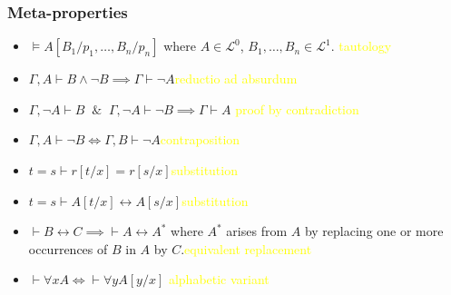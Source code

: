 \documentclass[UTF8,aspectratio=43,11pt,colorlinks,compress,openany]{beamer}%
\begin{document}
\begin{frame}\frametitle{Meta-properties}
	\begin{itemize}
		\item $\vDash A[B_1/p_1,\dots, B_n/p_n]$ where $A\in\mathscr{L}^0$, $B_1,\dots, B_n\in\mathscr{L}^1$. \hfill \textcolor{yellow}{tautology}
		\item $\Gamma, A\vdash B\wedge\neg B\implies\Gamma\vdash\neg A$\hfill\textcolor{yellow}{reductio ad absurdum}
		\item $\Gamma,\neg A\vdash B\;\;\&\;\;\Gamma,\neg A\vdash\neg B\implies\Gamma\vdash A$ \hfill \textcolor{yellow}{proof by contradiction}
		\item $\Gamma, A\vdash\neg B\iff\Gamma, B\vdash\neg A$\hfill\textcolor{yellow}{contraposition}
		\item $t=s\vdash r[t/x]=r[s/x]$\hfill\textcolor{yellow}{substitution}
		\item $t=s\vdash A[t/x]\leftrightarrow A[s/x]$\hfill\textcolor{yellow}{substitution}
		\item $\vdash B\leftrightarrow C\implies\vdash A\leftrightarrow A^*$ where $A^*$ arises from $A$ by replacing one or more occurrences of $B$ in $A$ by $C$.\hfill \textcolor{yellow}{equivalent replacement}
		\item $\vdash\forall x A\iff\vdash\forall y A[y/x]$ \hfill \textcolor{yellow}{alphabetic variant}
	\end{itemize}
\end{frame}
\end{document}
